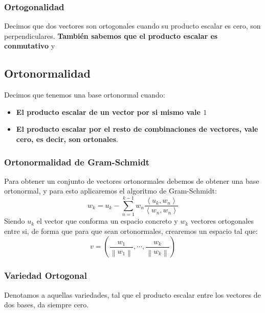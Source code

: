 \subsubsection{Ortogonalidad}
Decimos  que dos vectores son ortogonales cuando su producto escalar es cero, son perpendiculares. \textbf{También sabemos que el producto escalar es conmutativo} y
\subsection{Ortonormalidad}
Decimos que tenemos una base ortonormal cuando:
\begin{itemize}
        \item \textbf{El producto escalar de un vector por si mismo vale \(1\)}
        \item \textbf{El producto escalar por el resto de combinaciones de vectores, vale cero, es decir, son ortonales}.
\end{itemize}
\subsubsection{Ortonormalidad de Gram-Schmidt}
Para obtener un conjunto de vectores ortonormales debemos de obtener una base ortonormal, y para esto aplicaremos el algoritmo de Gram-Schmidt:
\[
        \boxed{w_k = u_k - \sum^{k-1}_{n=1} w_n\frac{\left\langle u_k, w_n\right\rangle }{\left\langle w_n, w_n\right\rangle }}
\]
Siendo \(u_k\) el vector que conforma un espacio concreto y \(w_k\) vectores ortogonales entre si, de forma que para que sean ortonormales, crearemos un espacio tal que:
\[
        v = \left(\frac{w_1}{\left\lVert w_1\right\rVert }, \cdots, \frac{w_k}{\left\lVert w_k\right\rVert }\right)
\]
\subsubsection{Variedad Ortogonal}
Denotamos a aquellas variedades, tal que el producto escalar entre los vectores de dos bases, da siempre cero.